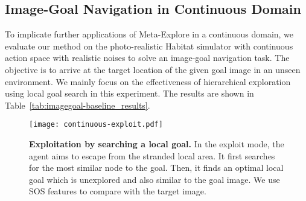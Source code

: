 \documentclass[10pt,twocolumn,letterpaper]{article}
\begin{document}
\begin{table}[t!]
\scriptsize
\setlength{\tabcolsep}{8.4pt}
\renewcommand{\arraystretch}{1}
\vspace{-0.2cm}
\caption{\protect\renewcommand{\baselinestretch}{0.88}\small Comparison and evaluation results of the local goal search methods using different target and candidate domains. (R2R)
}
\label{tab:trigger_compare_results-r2r}\vspace{-0.6cm}
\end{table}

\subsection{Image-Goal Navigation in Continuous Domain}\label{image-goal-suppl}
To implicate further applications of Meta-Explore in a continuous domain, we evaluate our method on the photo-realistic Habitat \cite{szot2021habitat} simulator with continuous action space with realistic noises to solve an image-goal navigation task. The objective is to arrive at the target location of the given goal image in an unseen environment. We mainly focus on the effectiveness of hierarchical exploration using local goal search in this experiment. The results are shown in Table~\ref{tab:imagegoal-baseline_results}. 

\begin{figure}[t!]{\centering\texttt{[image: continuous-exploit.pdf]}}\centering
\caption{{\textbf{Exploitation by searching a local goal.} In the exploit mode, the agent aims to escape from the stranded local area. It first searches for the most similar node to the goal. Then, it finds an optimal local goal which is unexplored and also similar to the goal image. We use SOS features to compare with the target image.
}}\label{fig:continuous-exploit}
\end{figure}
\end{document}
